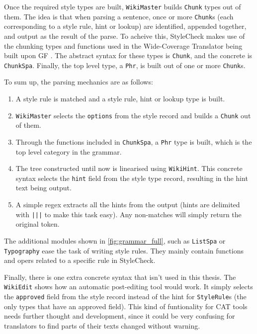 \noindent Once the required style types are built, \texttt{WikiMaster} builds \texttt{Chunk} types out of them. The idea is that when parsing a sentence, once or more \texttt{Chunk}s (each corresponding to a style rule, hint or lookup) are identified, appended together, and output as the result of the parse. To acheive this, StyleCheck makes use of the chunking types and functions used in the Wide-Coverage Translator being built upon \ac{GF} \parencite{ranta2014embedded}. The abstract syntax for these types is \texttt{Chunk}, and the concrete is \texttt{ChunkSpa}. Finally, the top level type, a \texttt{Phr}, is built out of one or more \texttt{Chunk}s.

To sum up, the parsing mechanics are as follows:

\begin{enumerate}
    \item A style rule is matched and a style rule, hint or lookup type is built.
    \item \texttt{WikiMaster} selects the \texttt{options} from the style record and builds a \texttt{Chunk} out of them.
    \item Through the functions included in \texttt{ChunkSpa}, a \texttt{Phr} type is built, which is the top level category in the grammar.
    \item The tree constructed until now is linearised using \texttt{WikiHint}. This concrete syntax selects the \texttt{hint} field from the style type record, resulting in the hint text being output.
    \item A simple regex extracts all the hints from the output (hints are delimited with \texttt{|||} to make this task easy). Any non-matches will simply return the original token.
\end{enumerate}

The additional modules shown in \autoref{fig:grammar_full}, such as \texttt{ListSpa} or \texttt{Typography} ease the task of writing style rules. They mainly contain functions and opers related to a specific rule in StyleCheck.

Finally, there is one extra concrete syntax that isn't used in this thesis. The \texttt{WikiEdit} shows how an automatic post-editing tool would work. It simply selects the \texttt{approved} field from the style record instead of the hint for \texttt{StyleRule}s (the only types that have an approved field). This kind of funtionality for \ac{CAT} tools needs further thought and development, since it could be very confusing for translators to find parts of their texts changed without warning.

